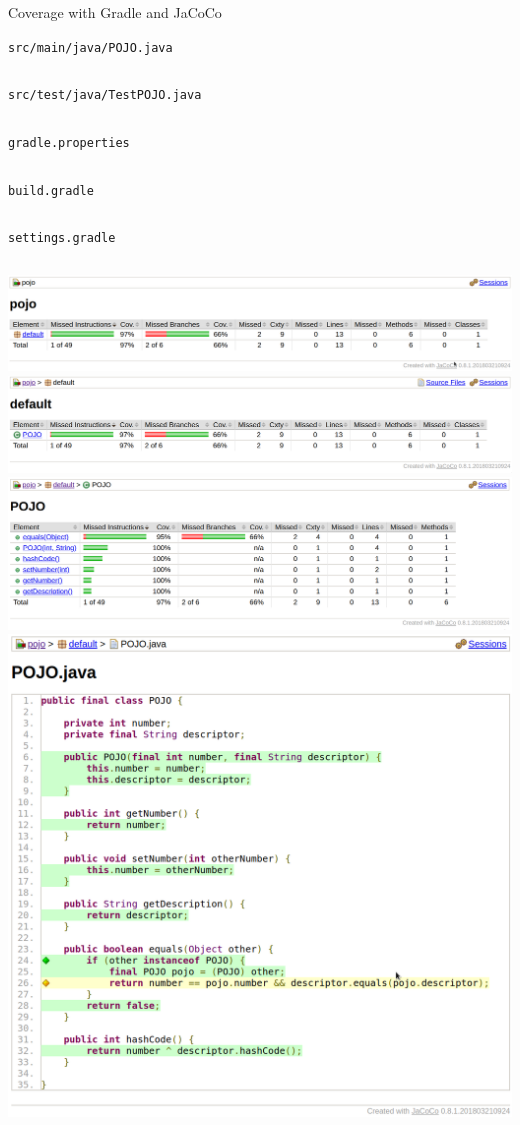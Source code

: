 \documentclass[presentation]{beamer}
\newcommand{\codefile}[4]{
	\begin{block}{\texttt{#2}}
		\inputminted[fontsize=#3,linenos=true,breaklines=true]{#4}{"workspace/#1/#2"}
	\end{block}
}
\newcommand{\java}[3]{\codefile{#1}{#2}{#3}{java}}
\newcommand{\groovy}[3]{\codefile{#1}{#2}{#3}{groovy}}
\newcommand{\tinier}{\fontsize{4pt}{5pt}\selectfont}
\begin{document}
\begin{frame}{Coverage with Gradle and JaCoCo}
    \java{19-Coverage}{src/main/java/POJO.java}{\tinier}
    \java{19-Coverage}{src/test/java/TestPOJO.java}{\tinier}
    \groovy{19-Coverage}{gradle.properties}{\scriptsize}
    \groovy{19-Coverage}{build.gradle}{\scriptsize}
    \groovy{19-Coverage}{settings.gradle}{\normalsize}
    \includegraphics[width=.9\textwidth,height=.8\textheight,keepaspectratio]{img/jacocoTestReport0}
    \includegraphics[width=.9\textwidth,height=.8\textheight,keepaspectratio]{img/jacocoTestReport1}
    \includegraphics[width=.9\textwidth,height=.8\textheight,keepaspectratio]{img/jacocoTestReport3}
    \includegraphics[width=.9\textwidth,height=.8\textheight,keepaspectratio]{img/jacocoTestReport4}
\end{frame}
\end{document}
